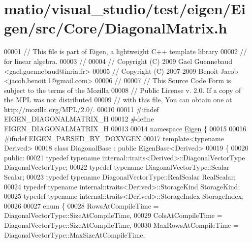 \hypertarget{matio_2visual__studio_2test_2eigen_2_eigen_2src_2_core_2_diagonal_matrix_8h_source}{}\section{matio/visual\+\_\+studio/test/eigen/\+Eigen/src/\+Core/\+Diagonal\+Matrix.h}
\label{matio_2visual__studio_2test_2eigen_2_eigen_2src_2_core_2_diagonal_matrix_8h_source}

\begin{DoxyCode}
00001 \textcolor{comment}{// This file is part of Eigen, a lightweight C++ template library}
00002 \textcolor{comment}{// for linear algebra.}
00003 \textcolor{comment}{//}
00004 \textcolor{comment}{// Copyright (C) 2009 Gael Guennebaud <gael.guennebaud@inria.fr>}
00005 \textcolor{comment}{// Copyright (C) 2007-2009 Benoit Jacob <jacob.benoit.1@gmail.com>}
00006 \textcolor{comment}{//}
00007 \textcolor{comment}{// This Source Code Form is subject to the terms of the Mozilla}
00008 \textcolor{comment}{// Public License v. 2.0. If a copy of the MPL was not distributed}
00009 \textcolor{comment}{// with this file, You can obtain one at http://mozilla.org/MPL/2.0/.}
00010 
00011 \textcolor{preprocessor}{#ifndef EIGEN\_DIAGONALMATRIX\_H}
00012 \textcolor{preprocessor}{#define EIGEN\_DIAGONALMATRIX\_H}
00013 
00014 \textcolor{keyword}{namespace }\hyperlink{namespace_eigen}{Eigen} \{ 
00015 
00016 \textcolor{preprocessor}{#ifndef EIGEN\_PARSED\_BY\_DOXYGEN}
00017 \textcolor{keyword}{template}<\textcolor{keyword}{typename} Derived>
00018 \textcolor{keyword}{class }DiagonalBase : \textcolor{keyword}{public} EigenBase<Derived>
00019 \{
00020   \textcolor{keyword}{public}:
00021     \textcolor{keyword}{typedef} \textcolor{keyword}{typename} internal::traits<Derived>::DiagonalVectorType DiagonalVectorType;
00022     \textcolor{keyword}{typedef} \textcolor{keyword}{typename} DiagonalVectorType::Scalar Scalar;
00023     \textcolor{keyword}{typedef} \textcolor{keyword}{typename} DiagonalVectorType::RealScalar RealScalar;
00024     \textcolor{keyword}{typedef} \textcolor{keyword}{typename} internal::traits<Derived>::StorageKind StorageKind;
00025     \textcolor{keyword}{typedef} \textcolor{keyword}{typename} internal::traits<Derived>::StorageIndex StorageIndex;
00026 
00027     \textcolor{keyword}{enum} \{
00028       RowsAtCompileTime = DiagonalVectorType::SizeAtCompileTime,
00029       ColsAtCompileTime = DiagonalVectorType::SizeAtCompileTime,
00030       MaxRowsAtCompileTime = DiagonalVectorType::MaxSizeAtCompileTime,

\end{DoxyCode}
